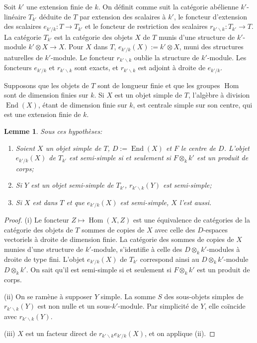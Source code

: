 \documentclass[11pt,a4paper]{article}
\theoremstyle{plain}
\newtheorem{lemma}[theorem]{Lemme}
\theoremstyle{definition}
\DeclareMathOperator{\Hom}{Hom}
\DeclareMathOperator{\End}{End}
\begin{document}
Soit $k'$ une extension finie de $k$. On d\'efinit comme suit la cat\'egorie ab\'elienne $k'$-lin\'eaire $T_{k'}$ d\'eduite de $T$ par extension des scalaires \`a $k'$, le foncteur d'extension des scalaires $e_{k'/k}: T \to T_{k'}$ et le foncteur de restriction des scalaires $r_{k' \backslash k}: T_{k'} \to T$. La cat\'egorie $T_{k'}$ est la cat\'egorie des objets $X$ de $T$ munis d'une structure de $k'$-module $k' \otimes X \to X$. Pour $X$ dans $T$, $e_{k'/k}(X) := k' \otimes X$, muni des structures naturelles de $k'$-module. Le foncteur $r_{k' \backslash k}$ oublie la structure de $k'$-module. Les foncteurs $e_{k'/k}$ et $r_{k' \backslash k}$ sont exacts, et $r_{k' \backslash k}$ est adjoint \`a droite de $e_{k'/k}$.

Supposons que les objets de $T$ sont de longueur finie et que les groupes $\Hom$ sont de dimension finies sur $k$. Si $X$ est un objet simple de $T$, l'alg\`ebre \`a division $\End(X)$, \'etant de dimension finie sur $k$, est centrale simple sur son centre, qui est une extension finie de $k$.

\begin{lemma}\label{lem:4.2}
Sous ces hypoth\`eses:
\begin{enumerate}[label=(\roman*)]
\item Soient $X$ un objet simple de $T$, $D := \End(X)$ et $F$ le centre de $D$. L'objet $e_{k'/k}(X)$ de $T_{k'}$ est semi-simple si et seulement si $F \otimes_k k'$ est un produit de corps;
\item Si $Y$ est un objet semi-simple de $T_{k'}$, $r_{k' \backslash k}(Y)$ est semi-simple;
\item Si $X$ est dans $T$ et que $e_{k'/k}(X)$ est semi-simple, $X$ l'est aussi.
\end{enumerate}
\end{lemma}

\begin{proof}
(i) Le foncteur $Z \mapsto \Hom(X, Z)$ est une \'equivalence de cat\'egories de la cat\'egorie des objets de $T$ sommes de copies de $X$ avec celle des $D$-espaces vectoriels \`a droite de dimension finie. La cat\'egorie des sommes de copies de $X$ munies d'une structure de $k'$-module, s'identifie \`a celle des $D \otimes_k k'$-modules \`a droite de type fini. L'objet $e_{k'/k}(X)$ de $T_{k'}$ correspond ainsi au $D \otimes_k k'$-module $D \otimes_k k'$. On sait qu'il est semi-simple si et seulement si $F \otimes_k k'$ est un produit de corps.

(ii) On se ram\`ene \`a supposer $Y$ simple. La somme $S$ des sous-objets simples de $r_{k' \backslash k}(Y)$ est non nulle et un sous-$k'$-module. Par simplicit\'e de $Y$, elle co\"incide avec $r_{k' \backslash k}(Y)$.

(iii) $X$ est un facteur direct de $r_{k' \backslash k} e_{k'/k}(X)$, et on applique (ii).
\end{proof}
\end{document}
